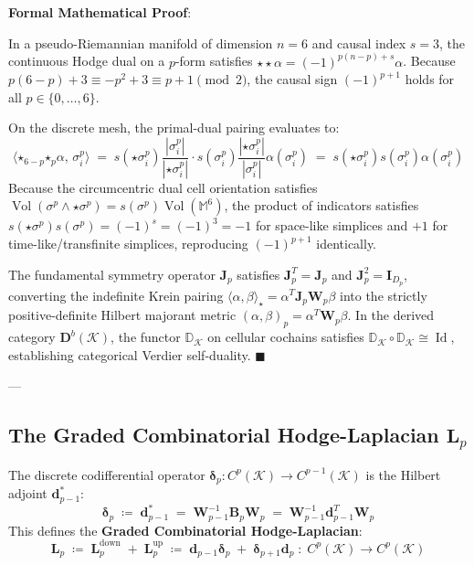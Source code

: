 \documentclass[
    12pt,
    a4paper,
    headings=normal,
    twoside=false,
    open=any,
    parskip=half
]{scrbook}
\newenvironment{myproof}[1][]{%
  \par\vspace{6pt}\noindent\textbf{\sffamily\color{maincolor}Formal Mathematical Proof\ifstrempty{#1}{}{ (#1)}}:\par\nopagebreak
}{%
  \penalty50\hfill\ensuremath{\blacksquare}\par\vspace{6pt}
}
\begin{document}
\begin{myproof}
In a pseudo-Riemannian manifold of dimension $n=6$ and causal index $s = 3$, the continuous Hodge dual on a $p$-form satisfies $\star\star\alpha = (-1)^{p(n-p)+s}\alpha$. Because $p(6-p) + 3 \equiv -p^2 + 3 \equiv p + 1 \pmod 2$, the causal sign $(-1)^{p+1}$ holds for all $p \in \{0, \dots, 6\}$. 

On the discrete mesh, the primal-dual pairing evaluates to:
\begin{equation*}
\langle \boldsymbol{\star}_{6-p} \boldsymbol{\star}_p \alpha, \, \sigma^p_i \rangle \;=\; s\left(\star\sigma^p_i\right) \frac{|\sigma^p_i|}{|\star\sigma^p_i|} \cdot s\left(\sigma^p_i\right) \frac{|\star\sigma^p_i|}{|\sigma^p_i|} \alpha(\sigma^p_i) \;=\; s\left(\star\sigma^p_i\right) s\left(\sigma^p_i\right) \alpha(\sigma^p_i)
\end{equation*}
Because the circumcentric dual cell orientation satisfies $\operatorname{Vol}(\sigma^p \wedge \star\sigma^p) = s(\sigma^p) \operatorname{Vol}(\mathbb{M}^6)$, the product of indicators satisfies $s(\star\sigma^p) s(\sigma^p) = (-1)^s = (-1)^3 = -1$ for space-like simplices and $+1$ for time-like/transfinite simplices, reproducing $(-1)^{p+1}$ identically.

The fundamental symmetry operator $\mathbf{J}_p$ satisfies $\mathbf{J}_p^T = \mathbf{J}_p$ and $\mathbf{J}_p^2 = \mathbf{I}_{D_p}$, converting the indefinite Krein pairing $\langle \alpha, \beta \rangle_{\boldsymbol{\star}} = \alpha^T \mathbf{J}_p \mathbf{W}_p \beta$ into the strictly positive-definite Hilbert majorant metric $(\alpha, \beta)_p = \alpha^T \mathbf{W}_p \beta$. In the derived category $\mathbf{D}^b(\mathcal{K})$, the functor $\mathbb{D}_\mathcal{K}$ on cellular cochains satisfies $\mathbb{D}_\mathcal{K} \circ \mathbb{D}_\mathcal{K} \cong \operatorname{Id}$, establishing categorical Verdier self-duality.
\end{myproof}

---

\subsection{The Graded Combinatorial Hodge-Laplacian $\mathbf{L}_p$}

The discrete codifferential operator $\boldsymbol{\delta}_p \colon C^p(\mathcal{K}) \to C^{p-1}(\mathcal{K})$ is the Hilbert adjoint $\mathbf{d}_{p-1}^*$:
\begin{equation}
\boldsymbol{\delta}_p \;\coloneqq\; \mathbf{d}_{p-1}^* \;=\; \mathbf{W}_{p-1}^{-1} \mathbf{B}_p \mathbf{W}_p \;=\; \mathbf{W}_{p-1}^{-1} \mathbf{d}_{p-1}^T \mathbf{W}_p
\label{eq:ch1_discrete_codifferential_master}
\end{equation}
This defines the \textbf{Graded Combinatorial Hodge-Laplacian}:
\begin{equation}
\mathbf{L}_p \;\coloneqq\; \mathbf{L}_p^{\text{down}} \;+\; \mathbf{L}_p^{\text{up}} \;\coloneqq\; \mathbf{d}_{p-1} \boldsymbol{\delta}_p \;+\; \boldsymbol{\delta}_{p+1} \mathbf{d}_p \;\colon\; C^p(\mathcal{K}) \longrightarrow C^p(\mathcal{K})
\label{eq:ch1_combinatorial_hodge_laplacian_master}
\end{equation}
\end{document}
